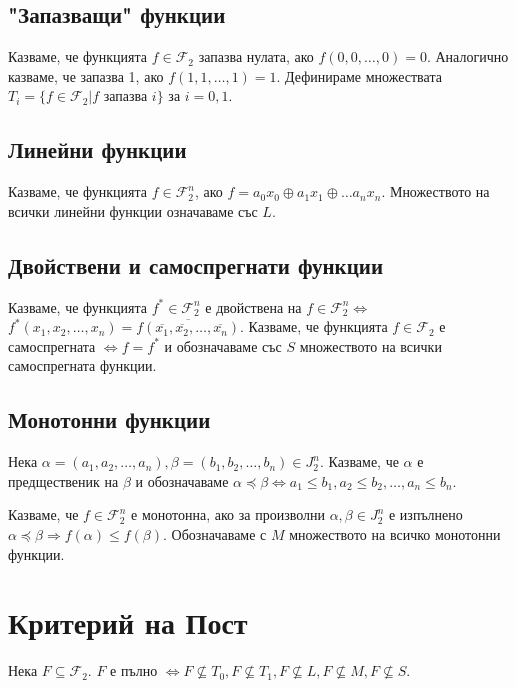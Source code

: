 \documentclass[fleqn,12pt]{article}
\begin{document}
\begin{flushleft}
\subsection{"Запазващи" функции}
Казваме, че функцията $f \in \mathcal{F}_2$ запазва нулата, ако $f(0, 0, \dots, 0) = 0$.
Аналогично казваме, че запазва 1, ако $f(1, 1, \dots, 1) = 1$.
Дефинираме множествата $T_i = \{f \in \mathcal{F}_2 | f \text{ запазва } i\}$ за $i=0,1$.

\subsection{Линейни функции}
Казваме, че функцията $f \in \mathcal{F}_2^n$, ако $f = a_0 x_0 \oplus a_1 x_1 \oplus \dots a_n x_n$.
Множеството на всички линейни функции означаваме със $L$.

\subsection{Двойствени и самоспрегнати функции}
Казваме, че функцията $f^* \in \mathcal{F}_2^n$ е двойствена на $f \in \mathcal{F}_2^n \Leftrightarrow$
$f^*(x_1, x_2, \dots, x_n) = \overline{f(\overline{x_1}, \overline{x_2}, \dots, \overline{x_n})}$.
Казваме, че функцията $f \in \mathcal{F}_2$ е самоспрегната $\Leftrightarrow f = f^*$ и обозначаваме със $S$ множеството
на всички самоспрегната функции.

\subsection{Монотонни функции}
Нека $\alpha = (a_1, a_2, \dots, a_n), \beta = (b_1, b_2, \dots, b_n) \in J_2^n$. Казваме, че
$\alpha$ е предщественик на $\beta$ и обозначаваме $\alpha \preceq \beta \Leftrightarrow a_1 \leq b_1, a_2 \leq b_2, \dots, a_n \leq b_n$.

Казваме, че $f \in \mathcal{F}_2^n$ е монотонна, ако за произволни $\alpha, \beta \in J_2^n$ е изпълнено
$\alpha \preceq \beta \Rightarrow f(\alpha) \leq f(\beta)$. Обозначаваме с $M$ множеството на всичко монотонни функции.

\section{Критерий на Пост}
Нека $F \subseteq \mathcal{F}_2$. $F$ е пълно $\Leftrightarrow F \nsubseteq T_0, F \nsubseteq T_1, F \nsubseteq L, F \nsubseteq M, F \nsubseteq S$.    

\end{flushleft}
\end{document}
